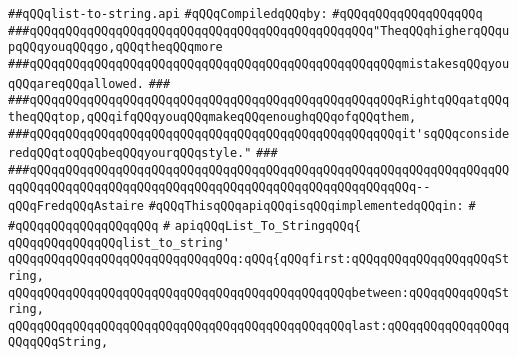 \label{src/lib/src/list-to-string.api}
\verb|##qQQqlist-to-string.api|\newline
\newline
\verb|#qQQqCompiledqQQqby:|\newline
\verb|#qQQqqQQqqQQqqQQqqQQq|\newline
\newline
\newline
\newline
\verb|###qQQqqQQqqQQqqQQqqQQqqQQqqQQqqQQqqQQqqQQqqQQqqQQq"TheqQQqhigherqQQqupqQQqyouqQQqgo,qQQqtheqQQqmore|\newline
\verb|###qQQqqQQqqQQqqQQqqQQqqQQqqQQqqQQqqQQqqQQqqQQqqQQqqQQqmistakesqQQqyouqQQqareqQQqallowed.|\newline
\verb|###|\newline
\verb|###qQQqqQQqqQQqqQQqqQQqqQQqqQQqqQQqqQQqqQQqqQQqqQQqqQQqRightqQQqatqQQqtheqQQqtop,qQQqifqQQqyouqQQqmakeqQQqenoughqQQqofqQQqthem,|\newline
\verb|###qQQqqQQqqQQqqQQqqQQqqQQqqQQqqQQqqQQqqQQqqQQqqQQqqQQqit'sqQQqconsideredqQQqtoqQQqbeqQQqyourqQQqstyle."|\newline
\verb|###|\newline
\verb|###qQQqqQQqqQQqqQQqqQQqqQQqqQQqqQQqqQQqqQQqqQQqqQQqqQQqqQQqqQQqqQQqqQQqqQQqqQQqqQQqqQQqqQQqqQQqqQQqqQQqqQQqqQQqqQQqqQQqqQQqqQQq--qQQqFredqQQqAstaire|\newline
\newline
\newline
\newline
\verb|#qQQqThisqQQqapiqQQqisqQQqimplementedqQQqin:|\newline
\verb|#|\newline
\verb|#qQQqqQQqqQQqqQQqqQQq|\newline
\verb|#|\newline
\verb|apiqQQqList_To_StringqQQq{|\newline
\newline
\verb|qQQqqQQqqQQqqQQqlist_to_string'|\newline
\verb|qQQqqQQqqQQqqQQqqQQqqQQqqQQqqQQq:qQQq{qQQqfirst:qQQqqQQqqQQqqQQqqQQqString,|\newline
\verb|qQQqqQQqqQQqqQQqqQQqqQQqqQQqqQQqqQQqqQQqqQQqqQQqbetween:qQQqqQQqqQQqString,|\newline
\verb|qQQqqQQqqQQqqQQqqQQqqQQqqQQqqQQqqQQqqQQqqQQqqQQqlast:qQQqqQQqqQQqqQQqqQQqqQQqString,|\newline
